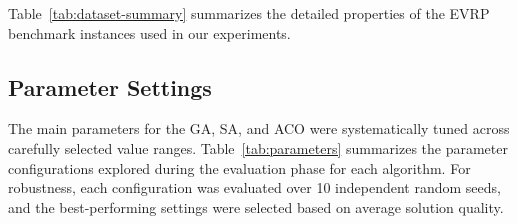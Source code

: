 Table~\ref{tab:dataset-summary} summarizes the detailed properties of the EVRP benchmark instances used in our experiments.





\subsection{Parameter Settings}
The main parameters for the GA, SA, and ACO were systematically tuned across carefully selected value ranges.  
Table~\ref{tab:parameters} summarizes the parameter configurations explored during the evaluation phase for each algorithm.  
For robustness, each configuration was evaluated over 10 independent random seeds, and the best-performing settings were selected based on average solution quality.

